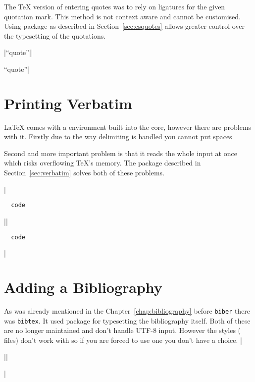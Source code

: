 The \TeX{} version of entering quotes was to rely on ligatures for the given
quotation mark. This method is not context aware and cannot be customised.
Using  package as described in Section~\ref{sec:csquotes} allows
greater control over the typesetting of the quotations.

\chto|``quote''||\usepackage{csquotes}
\enquote{quote}|

\section{Printing Verbatim}

\LaTeX{} comes with a  environment built into the core, however there are problems
with it. Firstly due to the way delimiting is handled you cannot put spaces
Second and more important problem is that it reads the whole input at once
which risks overflowing \TeX{}'s memory. The  package described
in Section~\ref{sec:verbatim} solves both of these problems.
\begin{chktexignore}
\chto|\begin{verbatim}
  code
\end{verbatim}||\usepackage{verbatim}
\begin{verbatim}
  code
\end{verbatim}|
\end{chktexignore}

\section{Adding a Bibliography}

As was already mentioned in the Chapter~\ref{chap:bibliography} before
\texttt{biber} there was \texttt{bibtex}. It used  package for
typesetting the bibliography itself. Both of these are no longer maintained and
don't handle UTF-8 input. However the  styles ( files)
don't work with  so if you are forced to use one you don't have a
choice.
\chto|\usepackage{natbib}||\usepackage{biblatex}|

\endgroup
